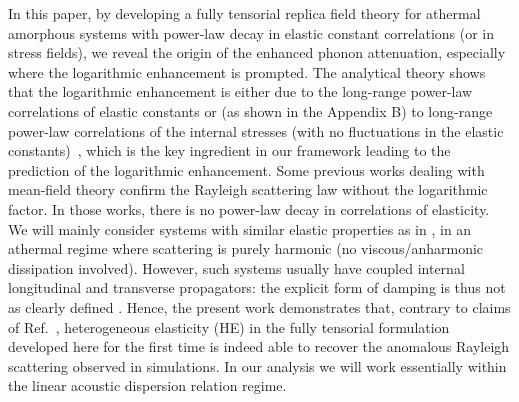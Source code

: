 \documentclass[twoside,twocolumn,9pt]{article}
\begin{document}
In this paper, by developing a fully tensorial replica field theory for athermal amorphous systems with power-law decay in elastic constant correlations (or in stress fields), we reveal the origin of the enhanced phonon attenuation, especially where the logarithmic enhancement is prompted. The analytical theory shows that the logarithmic enhancement is either due to the long-range power-law correlations of elastic constants \cite{John1983a, John1983b} or (as shown in the Appendix B) to long-range power-law correlations of the internal stresses (with no fluctuations in the elastic constants)~\cite{Jie2020,Maier2018}, which is the key ingredient in our framework leading to the prediction of the logarithmic enhancement. Some previous works dealing with mean-field theory confirm the Rayleigh scattering law without the logarithmic factor. In those works, there is no power-law decay in correlations of elasticity\cite{Maurer2004, Shimada2019,Wyart2010,Kohler2013,DeGiuli2014}. We will mainly consider systems with similar elastic properties as in \cite{Gelin2016}, in an athermal regime where scattering is purely harmonic (no viscous/anharmonic dissipation involved). However, such systems usually have coupled internal longitudinal and transverse propagators: the explicit form of damping is thus not as clearly defined \cite{lifshitz1986}. Hence, the present work demonstrates that, contrary to claims of Ref.~\cite{Lemaitre2019}, heterogeneous elasticity (HE) in the fully tensorial formulation developed here for the first time is indeed able to recover the anomalous Rayleigh scattering observed in simulations. In our analysis we will work essentially within the linear acoustic dispersion relation regime. 
\end{document}
